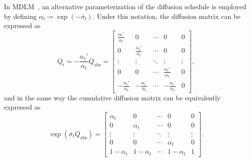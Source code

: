         In MDLM~\citep[Appendix C]{sahoo2024simple}, an alternative parameterization of the diffusion schedule is employed by defining $\alpha_t \coloneqq \exp(-\overline{\sigma}_t)$. Under this notation, the diffusion matrix can be expressed as
        \begin{equation}
            Q_t = -\frac{\alpha_t'}{\alpha_t} Q_{\text{abs}} =
            \begin{bmatrix}
                \frac{\alpha_t'}{\alpha_t} & 0 & \cdots & 0 & 0 \\
                0 & \frac{\alpha_t'}{\alpha_t} & \cdots & 0 & 0 \\
                \vdots & \vdots & \ddots & \vdots & \vdots \\
                0 & 0 & \cdots & \frac{\alpha_t'}{\alpha_t} & 0 \\
                -\frac{\alpha_t'}{\alpha_t} & -\frac{\alpha_t'}{\alpha_t} & \cdots & -\frac{\alpha_t'}{\alpha_t} & 0
            \end{bmatrix},
        \end{equation}
        and in the same way the cumulative diffusion matrix can be equivalently expressed as
        \begin{equation}
            \exp(\overline{\sigma}_t Q_{\text{abs}}) =
            \begin{bmatrix}
                \alpha_t & 0 & \cdots & 0 & 0 \\
                0 & \alpha_t & \cdots & 0 & 0 \\
                \vdots & \vdots & \ddots & \vdots & \vdots \\
                0 & 0 & \cdots & \alpha_t & 0 \\
                1 - \alpha_t & 1 - \alpha_t & \cdots & 1 - \alpha_t & 1
            \end{bmatrix}.
        \end{equation}
